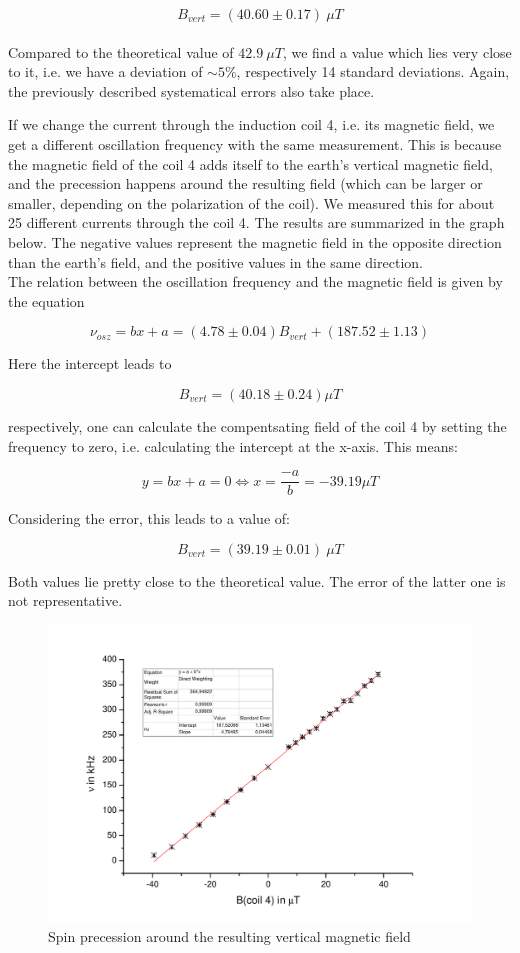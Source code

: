 $$\boxed{ B_{vert} = (40.60 \pm 0.17)\ \mu T }$$\\

Compared to the theoretical value of $42.9\ \mu T$, we find a value which lies very close to it, i.e. we have a deviation of $\sim 5\%$, respectively 14 standard deviations. Again, the previously described systematical errors also take place.

If we change the current through the induction coil 4, i.e. its magnetic field, we get a different oscillation frequency with the same measurement. This is because the magnetic field of the coil 4 adds itself to the earth's vertical magnetic field, and the precession happens around the resulting field (which can be larger or smaller, depending on the polarization of the coil).  We measured this for about 25 different currents through the coil 4. The results are summarized in the graph below. The negative values represent the magnetic field in the opposite direction than the earth's field, and the positive values in the same direction.\\

The relation between the oscillation frequency and the magnetic field is given by the equation

$$\nu_{osz} = bx + a = (4.78\pm0.04)B_{vert} + (187.52\pm1.13)$$

Here the intercept leads to

$$B_{vert} = (40.18 \pm 0.24)\mu T$$

respectively, one can calculate the compentsating field of the coil 4 by setting the frequency to zero, i.e. calculating the intercept at the x-axis. This means:

$$ y = bx + a = 0 \Leftrightarrow x = \frac{-a}{b} = -39.19 \mu T $$

Considering the error, this leads to a value of:

$$ B_{vert} = (39.19 \pm 0.01)\ \mu T $$

Both values lie pretty close to the theoretical value. The error of the latter one is not representative.

\begin{figure}[H]
\centering \includegraphics[width=1.1\textwidth]{BilderAusw/praezfeld.pdf}
\caption{Spin precession around the resulting vertical magnetic field}
\end{figure}

